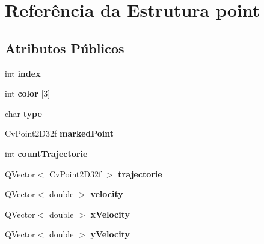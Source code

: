 \hypertarget{structpoint}{
\section{Referência da Estrutura point}
\label{structpoint}
}
\subsection*{Atributos Públicos}
\begin{DoxyCompactItemize}
\item 
\hypertarget{structpoint_ae82e4448ce95935a314a0bdac092d323}{
int {\bfseries index}}
\label{structpoint_ae82e4448ce95935a314a0bdac092d323}

\item 
\hypertarget{structpoint_acd75485cd1f3c375241dab1715c3ba06}{
int {\bfseries color} \mbox{[}3\mbox{]}}
\label{structpoint_acd75485cd1f3c375241dab1715c3ba06}

\item 
\hypertarget{structpoint_a55e8942fc567ae710248a769af027477}{
char {\bfseries type}}
\label{structpoint_a55e8942fc567ae710248a769af027477}

\item 
\hypertarget{structpoint_aad4aff3de6113ba159588d8af109f386}{
CvPoint2D32f {\bfseries markedPoint}}
\label{structpoint_aad4aff3de6113ba159588d8af109f386}

\item 
\hypertarget{structpoint_a3e7e06778a19d2a8e3f05e4f992dba3c}{
int {\bfseries countTrajectorie}}
\label{structpoint_a3e7e06778a19d2a8e3f05e4f992dba3c}

\item 
\hypertarget{structpoint_a45d614ddc0b5311f137d06de194a0919}{
QVector$<$ CvPoint2D32f $>$ {\bfseries trajectorie}}
\label{structpoint_a45d614ddc0b5311f137d06de194a0919}

\item 
\hypertarget{structpoint_aa67227e509832818b7a2b3e1a4055513}{
QVector$<$ double $>$ {\bfseries velocity}}
\label{structpoint_aa67227e509832818b7a2b3e1a4055513}

\item 
\hypertarget{structpoint_a6edbbcd5bf8695677a579dadffecde13}{
QVector$<$ double $>$ {\bfseries xVelocity}}
\label{structpoint_a6edbbcd5bf8695677a579dadffecde13}

\item 
\hypertarget{structpoint_ae6fe07e289012bc8d1538b389048e96d}{
QVector$<$ double $>$ {\bfseries yVelocity}}
\label{structpoint_ae6fe07e289012bc8d1538b389048e96d}


\end{DoxyCompactItemize}
